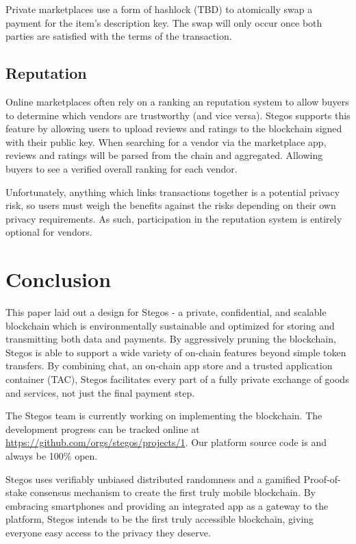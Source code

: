 \documentclass[8pt,fleqn,openany]{book}
\begin{document}
Private marketplaces use a form of hashlock (TBD) to atomically swap a payment for the item’s description key. The swap will only occur once both parties are satisfied with the terms of the transaction.

\subsection{Reputation}
Online marketplaces often rely on a ranking an reputation system to allow buyers to determine which vendors are trustworthy (and vice versa). Stegos supports this feature by allowing users to upload reviews and ratings to the blockchain signed with their public key. When searching for a vendor via the marketplace app, reviews and ratings will be parsed from the chain and aggregated. Allowing buyers to see a verified overall ranking for each vendor.

Unfortunately, anything which links transactions together is a potential privacy risk, so users must weigh the benefits against the risks depending on their own privacy requirements. As such, participation in the reputation system is entirely optional for vendors.

\section{Conclusion}
This paper laid out a design for Stegos - a private, confidential, and scalable blockchain which is environmentally sustainable and optimized for storing and transmitting both data and payments. By aggressively pruning the blockchain, Stegos is able to support a wide variety of on-chain features beyond simple token transfers. By combining chat, an on-chain app store and a trusted application container (TAC), Stegos facilitates every part of a fully private exchange of goods and services, not just the final payment step.

The Stegos team is currently working on implementing the blockchain. The development progress can be tracked online at \url{https://github.com/orgs/stegos/projects/1}. Our platform source code is and always be 100\% open.

Stegos uses verifiably unbiased distributed randomness and a gamified Proof-of-stake consensus mechanism to create the first truly mobile blockchain. By embracing smartphones and providing an integrated app as a gateway to the platform, Stegos intends to be the first truly accessible blockchain, giving everyone easy access to the privacy they deserve.     
\end{document}
